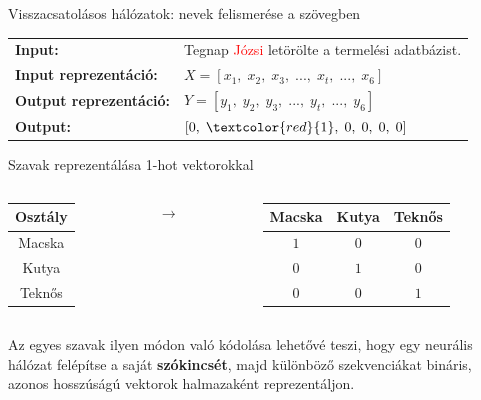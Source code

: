 \documentclass[english, aspectratio=169]{beamer}
\begin{document}
\begin{frame}{Visszacsatolásos hálózatok: nevek felismerése a szövegben}
\renewcommand{\arraystretch}{3.}
\begin{tabularx}{\textwidth}{m{4cm}m{10cm}}
\textbf{Input:} & Tegnap \textcolor{red}{Józsi} letörölte a termelési adatbázist.\\
\textbf{Input reprezentáció:} & $X = \left[ x_{1},\;x_{2},\;x_{3},\;...,\;x_{t},\;...,\;x_{6} \right]$\\
\textbf{Output reprezentáció:} & $Y = \left[ y_{1},\;y_{2},\;y_{3},\;...,\;y_{t},\;...,\;y_{6} \right]$\\
\textbf{Output:} & $\left[ 0,\; \textcolor{red}{1},\; 0,\; 0,\; 0,\; 0\right]$\\
\end{tabularx}
\end{frame}

\begin{frame}{Szavak reprezentálása 1-hot vektorokkal}
\begin{columns}
\begin{column}{.3\textwidth}
\begin{flushright}
\renewcommand{\arraystretch}{2}
\begin{tabular}{|c|}
\hline
\textbf{Osztály}\\
\hline
Macska\\
\hline
Kutya\\
\hline
Teknős\\
\hline
\end{tabular}
\end{flushright}
\end{column}
\begin{column}{.1\textwidth}
\begin{center}
\begin{Huge}
$\longrightarrow$
\end{Huge}
\end{center}
\end{column}
\begin{column}{.6\textwidth}
\begin{flushleft}
\renewcommand{\arraystretch}{2}
\begin{tabular}{|c|c|c|}
\hline
\textbf{Macska} & \textbf{Kutya} & \textbf{Teknős}\\
\hline
$1$ & $0$ & $0$\\
\hline
$0$ & $1$ & $0$\\
\hline
$0$ & $0$ & $1$\\
\hline
\end{tabular}
\end{flushleft}
\end{column}
\end{columns}
\medskip
Az egyes szavak ilyen módon való kódolása lehetővé teszi, hogy egy neurális hálózat felépítse a saját \textbf{szókincsét}, majd különböző szekvenciákat bináris, azonos hosszúságú vektorok halmazaként reprezentáljon.
\end{frame}
\end{document}
